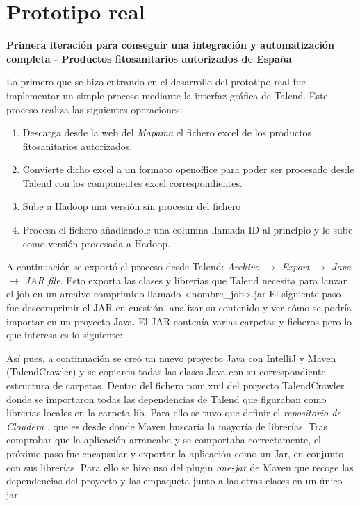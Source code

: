 \section{Prototipo real} \label{implementacion.prototipo}
\par 
\textbf{Primera iteración para conseguir una integración y automatización completa - Productos fitosanitarios autorizados de España}
\bigskip
\par Lo primero que se hizo entrando en el desarrollo del prototipo real fue implementar un simple proceso mediante la interfaz gráfica de Talend. Este proceso realiza las siguientes operaciones: 
\begin{enumerate}
\item Descarga desde la web del \textit{Mapama} el fichero excel de los productos fitosanitarios autorizados.
\item Convierte dicho excel a un formato openoffice para poder ser procesado desde Talend con los componentes excel correspondientes. 
\item Sube a Hadoop una versión sin procesar del fichero
\item Procesa el fichero añadiendole una columna llamada ID al principio y lo sube como versión procesada a Hadoop. 
\end{enumerate} 

A continuación se exportó el proceso desde Talend: 
\textit{Archivo $\rightarrow$ Export $\rightarrow$ Java $\rightarrow$ JAR file}. Esto exporta las clases y librerias que Talend necesita para lanzar el job en un archivo comprimido llamado <nombre\_job>.jar
El siguiente paso fue descomprimir el JAR en cuestión, analizar su contenido y ver cómo se podría importar en un proyecto Java. El JAR contenía varias carpetas y ficheros pero lo que interesa es lo siguiente:
\bigskip
\par 
{}
\bigskip
\par
Así pues, a continuación se creó un nuevo proyecto Java con IntelliJ y Maven (TalendCrawler) y se copiaron todas las clases Java con su correspondiente estructura de carpetas. Dentro del fichero pom.xml del proyecto TalendCrawler donde se importaron todas las dependencias de Talend que figuraban como librerías locales en la carpeta lib. Para ello se tuvo que definir el \textit{repositorio de Cloudera} \cite{cloudera}, que es desde donde Maven buscaría la mayoría de librerías. Tras comprobar que la aplicación arrancaba y se comportaba correctamente, el próximo paso fue encapsular y exportar la aplicación como un Jar, en conjunto con sus librerías. Para ello se hizo uso del plugin \textit{one-jar} de Maven que recoge las dependencias del proyecto y las empaqueta junto a las otras clases en un único jar.\par 


